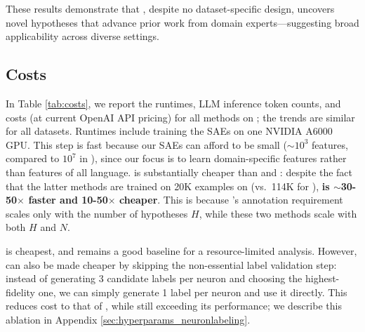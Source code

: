 These results demonstrate that \ourmethod, despite no dataset-specific design, uncovers novel hypotheses that advance prior work from domain experts—suggesting broad applicability across diverse settings.







\subsection{Costs}

In Table \ref{tab:costs}, we report the runtimes, LLM inference token counts, and costs (at current OpenAI API pricing) for all methods on \congress; the trends are similar for all datasets.
Runtimes include training the SAEs on one NVIDIA A6000 GPU.
This step is fast because our SAEs can afford to be small ($\sim$$10^3$ features, compared to $10^7$ in \citet{gao_scaling_2024}), since our focus is to learn domain-specific features rather than features of all language.
\ourmethod is substantially cheaper than \nlparam and \hypogenic: despite the fact that the latter methods are trained on 20K examples on \congress (vs.~114K for \ourmethod), \textbf{\ourmethod is $\sim$30-50$\times$ faster and 10-50$\times$ cheaper}.
This is because \ourmethod's annotation requirement scales only with the number of hypotheses $H$, while these two methods scale with both $H$ and $N$.

\bertopic is cheapest, and remains a good baseline for a resource-limited analysis.
However, \ourmethod can also be made cheaper by skipping the non-essential label validation step: instead of generating 3 candidate labels per neuron and choosing the highest-fidelity one, we can simply generate 1 label per neuron and use it directly.
This reduces cost to that of \bertopic, while still exceeding its performance; we describe this ablation in Appendix \ref{sec:hyperparams_neuronlabeling}.




